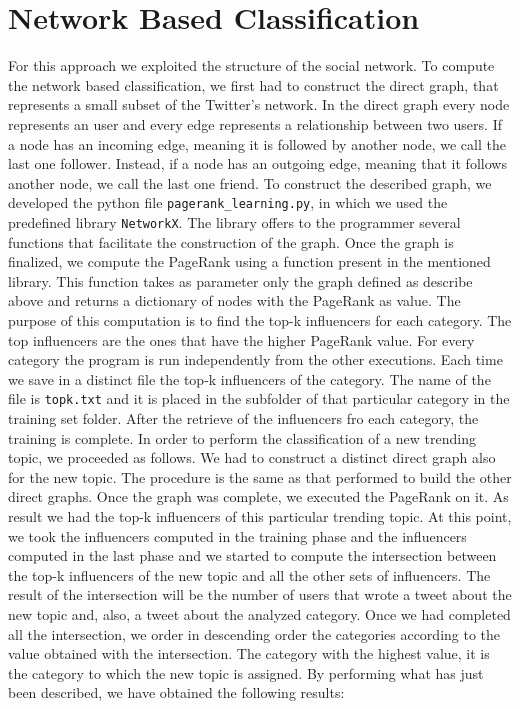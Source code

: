 \documentclass[journal,11pt]{vgtc}
\begin{document}
\section{Network Based Classification}
For this approach we exploited the structure of the social network.
To compute the network based classification, we first had to construct the direct graph, that represents a small 
subset of the Twitter's network. 
In the direct graph every node represents an user and every edge represents a relationship between two users.
If a node has an incoming edge, meaning it is followed by another node, we call the last one follower. Instead, if a node has an 
outgoing edge, meaning that it follows another node, we call the last one friend.
To construct the described graph, we developed the python file \texttt{pagerank\_learning.py}, in which we used the predefined library \texttt{NetworkX}. The library offers to the programmer 
several functions that facilitate the construction of the graph. 
Once the graph is finalized, we compute the PageRank using a function present in the mentioned library. 
This function takes as parameter only the graph defined as describe above and returns a dictionary of nodes 
with the PageRank as value. 
The purpose of this computation is to find the top-k influencers for each category. The top influencers
are the ones that have the higher PageRank value.
For every category the program is run independently from the other executions. Each time we save in a 
distinct file the top-k influencers of the category. The name of the file is 
\texttt{topk.txt} and it is placed in the subfolder of that particular category in the training set folder.
After the retrieve of the influencers fro each category, the training is complete. 
In order to perform the classification of a new trending topic, we proceeded as follows. 
We had to construct a distinct direct graph also for the new topic. The procedure is the same as that performed
to build the other direct graphs. Once the graph was complete, we executed the PageRank on it. 
As result we had the top-k influencers of this particular trending topic. 
At this point, we took the influencers computed in the training phase and the influencers computed in the
last phase and we started to compute the intersection between the top-k influencers of the new topic and 
all the other sets of influencers. 
The result of the intersection will be the number of users that wrote a tweet about the new topic and, also, 
a tweet about the analyzed category. 
Once we had completed all the intersection, we order in descending order the categories according to the 
value obtained with the intersection. The category with the highest value, it is the category
to which the new topic is assigned.
By performing what has just been described, we have obtained the following results:



\end{document}
